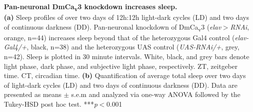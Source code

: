 \label{fig:5}
\textbf{Pan-neuronal DmCa\textsubscript{v}3 knockdown increases sleep.}
\\
\textbf{(a)} Sleep profiles of over two days of 12h:12h light-dark cycles (LD) and two days of continuous darkness (DD). Pan-neuronal knockdown of DmCa\textsubscript{v}3 (\emph{elav$>$RNAi}, orange, n=44) increases sleep beyond that of the heterozygous Gal4 control (\emph{elav-Gal4/+}, black, n=38) and the heterozygous UAS control (\emph{UAS-RNAi/+}, grey, n=42).
Sleep is plotted in 30 minute intervals.
White, black, and grey bars denote light phase, dark phase, and subjective light phase, respectively.
ZT, zeitgeber time.
CT, circadian time.
\textbf{(b)} Quantification of average total sleep over two days of light-dark cycles (LD) and two days of continuous darkness (DD).
Data are presented as means $\pm$ s.e.m and analyzed via one-way ANOVA followed by the Tukey-HSD post hoc test.
***\emph{p}$<$0.001
